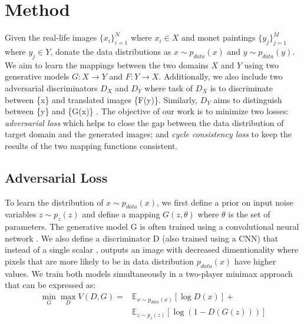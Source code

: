 \documentclass[10pt,twocolumn,letterpaper]{article}
\begin{document}
\section{Method}
Given the real-life images $\{x_i\}_{i=1}^N$ where $x_{i}\in X$ and monet paintings $\{y_j\}_{j=1}^M$ where $y_{j}\in Y$, donate the data distributions as $x \sim p_{data}(x)$ and $y \sim p_{data}(y)$. We aim to learn the mappings between the two domains $X$ and $Y$ using two generative models $G : X \longrightarrow Y$ and $F : Y \longrightarrow X$. Additionally, we also include two adversarial discriminators $D_{X}$ and $D_{Y}$ where task of $D_{X}$ is to discriminate between \{x\} and translated images \{F(y)\}. Similarly, $D_{Y}$ aims to distinguish between \{y\} and \{G(x)\} \cite{cyclegan}. The objective of our work is to minimize two losses: \emph{adversarial loss} \cite{simplegan} which helps to close the gap between the data distribution of target domain and the generated images; and \emph{cycle consistency loss} to keep the results of the two mapping functions consistent.

\subsection{Adversarial Loss}
To learn the distribution of $x \sim p_{data}(x)$, we first define a prior on input noise variables $z \sim p_{z}(z)$ and define a mapping $G(z,\theta)$ where $\theta$ is the set of parameters. The generative model G is often trained using a convolutional neural network \cite{cnn}. We also define a discriminator D (also trained using a CNN) that instead of a single scalar \cite{simplegan}, outputs an image with decreased dimentionality where pixels that are more likely to be in data distribution $p_{data}(x)$ have higher values. We train both models simultaneously in a two-player minimax approach that can be expressed as:
\begin{equation}
	\begin{split}
		\min_G \max_D V(D,G) = &\mathbb{E}_{x \sim p_{data}(x)}[\log{D(x)}]+ \\
		&\mathbb{E}_{z \sim p_{z}(z)}[\log{(1-D(G(z)))}]
	\end{split}
\end{equation}
\end{document}
